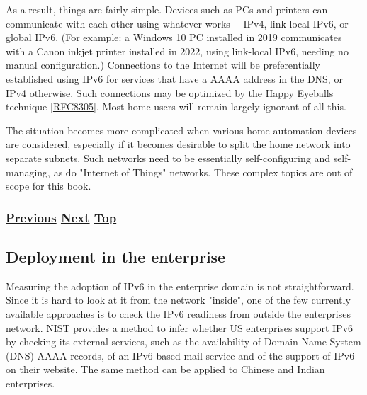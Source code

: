 \documentclass[
]{article}
\begin{document}
As a result, things are fairly simple. Devices such as PCs and printers
can communicate with each other using whatever works -\/- IPv4,
link-local IPv6, or global IPv6. (For example: a Windows 10 PC installed
in 2019 communicates with a Canon inkjet printer installed in 2022,
using link-local IPv6, needing no manual configuration.) Connections to
the Internet will be preferentially established using IPv6 for services
that have a AAAA address in the DNS, or IPv4 otherwise. Such connections
may be optimized by the Happy Eyeballs technique
{[}\href{https://www.rfc-editor.org/info/rfc8305}{RFC8305}{]}. Most home
users will remain largely ignorant of all this.

The situation becomes more complicated when various home automation
devices are considered, especially if it becomes desirable to split the
home network into separate subnets. Such networks need to be essentially
self-configuring and self-managing, as do "Internet of Things" networks.
These complex topics are out of scope for this book.

\subsubsection{\texorpdfstring{\hyperref[deployment-by-carriers]{Previous}
\hyperref[deployment-in-the-enterprise]{Next}
\hyperref[deployment-status]{Top}}{Previous Next Top}}\label{previous-next-top-29}

\pagebreak

\subsection{Deployment in the
enterprise}\label{deployment-in-the-enterprise}

Measuring the adoption of IPv6 in the enterprise domain is not
straightforward. Since it is hard to look at it from the network
"inside", one of the few currently available approaches is to check the
IPv6 readiness from outside the enterprise\textquotesingle s network.
\href{https://fedv6-deployment.antd.nist.gov/cgi-bin/generate-com}{NIST}
provides a method to infer whether US enterprises support IPv6 by
checking its external services, such as the availability of Domain Name
System (DNS) AAAA records, of an IPv6-based mail service and of the
support of IPv6 on their website. The same method can be applied to
\href{http://218.2.231.237:5001/cgi-bin/generate}{Chinese} and
\href{https://cnlabs.in/IPv6_Mon/generate_industry.html}{Indian}
enterprises.
\end{document}

